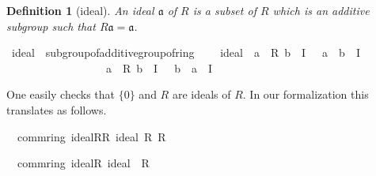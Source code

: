 \documentclass[12pt]{scrartcl}
\newtheorem{definition}[proposition]{Definition}
\begin{document}
\begin{definition}[ideal]
	An ideal $\mathfrak{a}$ of $R$ is a subset of $R$ which is an additive subgroup such that $R\mathfrak{a} = \mathfrak{a}$.
\end{definition}


\begin{isabelle}
\isamarkupfalse%
\ ideal\ {\isacharequal}{\kern0pt}\ subgroup{\isacharunderscore}{\kern0pt}of{\isacharunderscore}{\kern0pt}additive{\isacharunderscore}{\kern0pt}group{\isacharunderscore}{\kern0pt}of{\isacharunderscore}{\kern0pt}ring\ {\isacharplus}{\kern0pt}\isanewline
\ \ \ ideal{\isacharcolon}{\kern0pt}\ {\isachardoublequoteopen}{\isasymlbrakk}\ a\ {\isasymin}\ R{\isacharsemicolon}{\kern0pt}\ b\ {\isasymin}\ I\ {\isasymrbrakk}\ {\isasymLongrightarrow}\ a\ {\isasymcdot}\ b\ {\isasymin}\ I{\isachardoublequoteclose}\ \isanewline
\ \ \ \ \ \ \ \ \ \ \ \ \ \ \ \ \ {\isachardoublequoteopen}{\isasymlbrakk}\ a\ {\isasymin}\ R{\isacharsemicolon}{\kern0pt}\ b\ {\isasymin}\ I\ {\isasymrbrakk}\ {\isasymLongrightarrow}\ b\ {\isasymcdot}\ a\ {\isasymin}\ I{\isachardoublequoteclose}
\end{isabelle}

One easily checks that $\lbrace 0 \rbrace$ and $R$ are ideals of $R$. In our formalization this translates as follows.


\begin{isabelle}
\isamarkupfalse%
\ {\isacharparenleft}{\kern0pt}\ comm{\isacharunderscore}{\kern0pt}ring{\isacharparenright}{\kern0pt}\ ideal{\isacharunderscore}{\kern0pt}R{\isacharunderscore}{\kern0pt}R{\isacharcolon}{\kern0pt}\ {\isachardoublequoteopen}ideal\ R\ R\ {\isacharparenleft}{\kern0pt}{\isacharplus}{\kern0pt}{\isacharparenright}{\kern0pt}\ {\isacharparenleft}{\kern0pt}{\isasymcdot}{\isacharparenright}{\kern0pt}\ {\isasymzero}\ {\isasymone}{\isachardoublequoteclose}
\end{isabelle}

\begin{isabelle}
\isamarkupfalse%
\ {\isacharparenleft}{\kern0pt}\ comm{\isacharunderscore}{\kern0pt}ring{\isacharparenright}{\kern0pt}\ ideal{\isacharunderscore}{\kern0pt}{}{\isacharunderscore}{\kern0pt}R{\isacharcolon}{\kern0pt}\ {\isachardoublequoteopen}ideal\ {\isacharbraceleft}{\kern0pt}{\isasymzero}{\isacharbraceright}{\kern0pt}\ R\ {\isacharparenleft}{\kern0pt}{\isacharplus}{\kern0pt}{\isacharparenright}{\kern0pt}\ {\isacharparenleft}{\kern0pt}{\isasymcdot}{\isacharparenright}{\kern0pt}\ {\isasymzero}\ {\isasymone}{\isachardoublequoteclose}
\end{isabelle}
\end{document}
